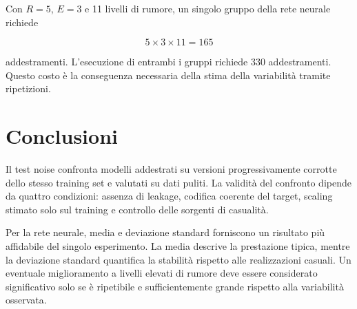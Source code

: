 \documentclass[11pt,a4paper]{article}
\begin{document}
Con $R=5$, $E=3$ e 11 livelli di rumore, un singolo gruppo della rete neurale richiede

\[
5\times 3\times 11=165
\]

addestramenti. L'esecuzione di entrambi i gruppi richiede 330 addestramenti. Questo costo è la conseguenza necessaria della stima della variabilità tramite ripetizioni.

\section{Conclusioni}

Il test noise confronta modelli addestrati su versioni progressivamente corrotte dello stesso training set e valutati su dati puliti. La validità del confronto dipende da quattro condizioni: assenza di leakage, codifica coerente del target, scaling stimato solo sul training e controllo delle sorgenti di casualità.

Per la rete neurale, media e deviazione standard forniscono un risultato più affidabile del singolo esperimento. La media descrive la prestazione tipica, mentre la deviazione standard quantifica la stabilità rispetto alle realizzazioni casuali. Un eventuale miglioramento a livelli elevati di rumore deve essere considerato significativo solo se è ripetibile e sufficientemente grande rispetto alla variabilità osservata.
\end{document}
